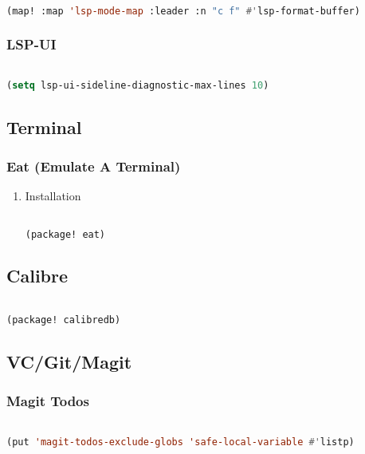 \documentclass[11pt]{article}
\begin{document}
\begin{lstlisting}[language=Lisp]%! Someone please complete this list for me

(map! :map 'lsp-mode-map :leader :n "c f" #'lsp-format-buffer)
\end{lstlisting}

\subsubsection{LSP-UI}
\label{sec:lsp-ui}
\begin{lstlisting}[language=Lisp]%! Someone please complete this list for me

(setq lsp-ui-sideline-diagnostic-max-lines 10)
\end{lstlisting}


\subsection{Terminal}
\label{sec:terminal}


\subsubsection{Eat (Emulate A Terminal)}
\label{sec:eat-emulate-a-terminal}


\begin{enumerate}
  \item Installation
  \label{sec:installation-3}

  \begin{lstlisting}[language=Lisp]%! Someone please complete this list for me

(package! eat)
\end{lstlisting}
\end{enumerate}


\subsection{Calibre}
\label{sec:calibre}
\begin{lstlisting}[language=Lisp]%! Someone please complete this list for me

(package! calibredb)
\end{lstlisting}

\subsection{VC/Git/Magit}
\label{sec:vcgitmagit}


\subsubsection{Magit Todos}
\label{sec:magit-todos}
\begin{lstlisting}[language=Lisp]%! Someone please complete this list for me

(put 'magit-todos-exclude-globs 'safe-local-variable #'listp)
\end{lstlisting}
\end{document}
